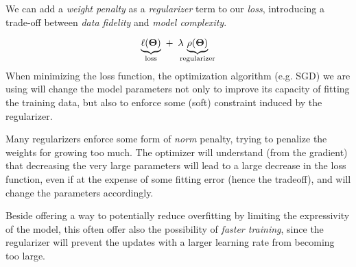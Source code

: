 
We can add a \emph{weight penalty} as a \emph{regularizer} term to our \emph{loss}, introducing a trade-off between \emph{data fidelity} and \emph{model complexity}. 

\begin{equation}
    \underbrace{\ell(\bm{\Theta})}_{\textrm{loss}} ~ + \,~\lambda \hspace{-0.2cm} \underbrace{\rho(\bm{\Theta})}_{\textrm{regularizer}}    
\end{equation}
When minimizing the loss function, the optimization algorithm (e.g. SGD) we are using will change the model parameters not only to improve its capacity of fitting the training data, but also to enforce some (soft) constraint induced by the regularizer.

Many regularizers enforce some form of \emph{norm} penalty, trying to penalize the weights for growing too much. The optimizer will understand (from the gradient) that decreasing the very large parameters will lead to a large decrease in the loss function, even if at the expense of some fitting error (hence the tradeoff), and will change the parameters accordingly.

Beside offering a way to potentially reduce overfitting by limiting the expressivity of the model, this often offer also the possibility of \emph{faster training}, since the regularizer will prevent the updates with a larger learning rate from becoming too large.
\\

